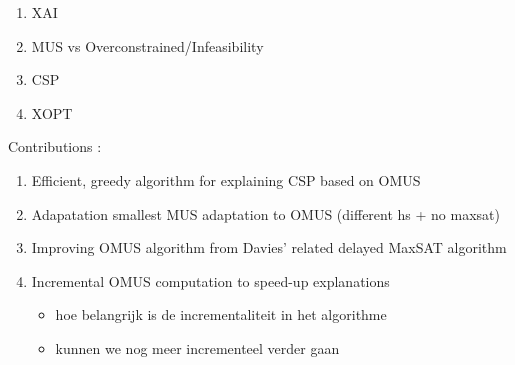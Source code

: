 \begin{enumerate}
    \item XAI
    \item MUS vs Overconstrained/Infeasibility
    \item CSP
    \item XOPT
\end{enumerate}

Contributions : 
\begin{enumerate}
    \item Efficient, greedy algorithm for explaining CSP based on OMUS 
    \item Adapatation smallest MUS adaptation to OMUS (different hs + no maxsat) 
    \item Improving OMUS algorithm from Davies' related delayed MaxSAT algorithm 
    \item Incremental OMUS computation to speed-up explanations
    \begin{itemize}
        \item hoe belangrijk is de incrementaliteit in het algorithme
        \item kunnen  we nog meer incrementeel verder gaan
    \end{itemize}
\end{enumerate}

